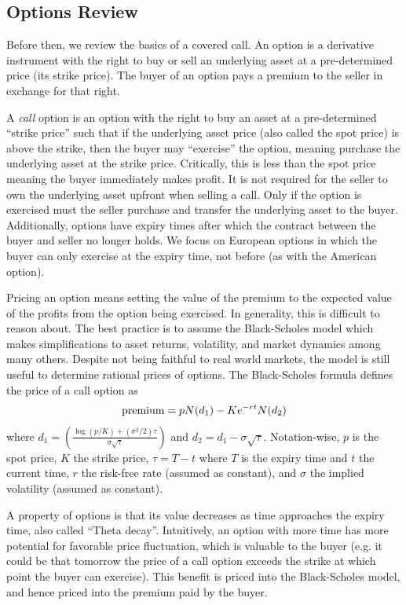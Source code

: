 \documentclass[hidelinks, 12pt]{article}
\begin{document}
\subsection{Options Review}

Before then, we review the basics of a covered call. An option is a derivative instrument with the right to buy or sell an underlying asset at a pre-determined price (its strike price). The buyer of an option pays a premium to the seller in exchange for that right.

A \textit{call} option is an option with the right to buy an asset at a pre-determined ``strike price'' such that if the underlying asset price (also called the spot price) is above the strike, then the buyer may ``exercise'' the option, meaning purchase the underlying asset at the strike price. Critically, this is less than the spot price meaning the buyer immediately makes profit. It is not required for the seller to own the underlying asset upfront when selling a call. Only if the option is exercised must the seller purchase and transfer the underlying asset to the buyer. Additionally, options have expiry times after which the contract between the buyer and seller no longer holds. We focus on European options in which the buyer can only exercise at the expiry time, not before (as with the American option).

Pricing an option means setting the value of the premium to the expected value of the profits from the option being exercised. In generality, this is difficult to  reason about. The best practice is to assume the  Black-Scholes model which makes simplifications to asset returns, volatility, and market dynamics among many others. Despite not being faithful to real world markets, the model is still useful to determine rational prices of options. The Black-Scholes formula defines the price of a call option as
\[\textup{premium} = p N(d_1) - K e^{-rt} N(d_2)\]
where $d_1 = \left( \frac{\log(p/K) + (\sigma^2/2)\tau}{\sigma\sqrt{\tau}}\right)$ and $d_2 = d_1 - \sigma\sqrt{\tau}$. Notation-wise, $p$ is the spot price, $K$  the strike price, $\tau = T-t$ where $T$ is the expiry time and $t$ the current time, $r$ the risk-free rate (assumed as constant), and $\sigma$ the implied volatility (assumed as constant).

A property of options is that its value decreases as time approaches the expiry time, also called ``Theta decay''. Intuitively, an option with more time has more potential for favorable price fluctuation, which is valuable to the buyer (e.g. it could be that tomorrow the price of a call option exceeds the strike at which point the buyer can exercise). This benefit is priced into the Black-Scholes model, and hence priced into the premium paid by the buyer.
\end{document}
